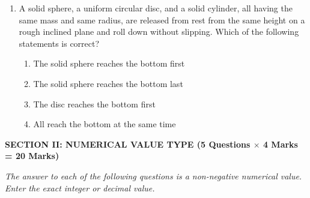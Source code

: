\documentclass[11pt,a4paper]{article}
\begin{document}
\begin{enumerate}[label=\textbf{Q\arabic*.},leftmargin=24pt,itemsep=12pt]
  \item A solid sphere, a uniform circular disc, and a solid cylinder, all having the same mass and same radius, are released from rest from the same height on a rough inclined plane and roll down without slipping. Which of the following statements is correct?
  \begin{enumerate}[label=(\Alph*),itemsep=2pt]
    \item The solid sphere reaches the bottom first
    \item The solid sphere reaches the bottom last
    \item The disc reaches the bottom first
    \item All reach the bottom at the same time
  \end{enumerate}

\end{enumerate}

\vspace{15pt}

\begin{tcolorbox}[sectionheader]
  \textbf{\textsf{SECTION II: NUMERICAL VALUE TYPE (5 Questions $\times$ 4 Marks = 20 Marks)}}
\end{tcolorbox}
\vspace{4pt}
\textit{The answer to each of the following questions is a non-negative numerical value. Enter the exact integer or decimal value.}
\vspace{6pt}
\end{document}
